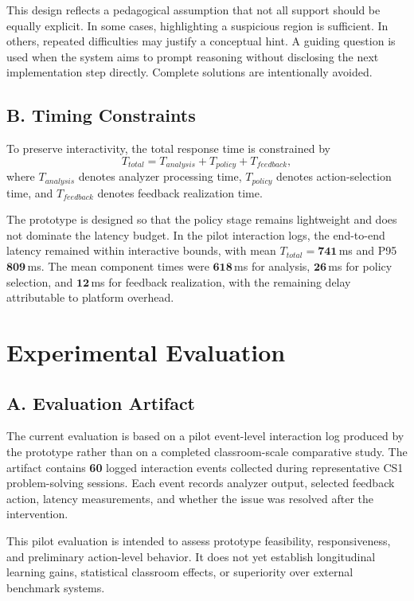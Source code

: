 \documentclass[conference]{IEEEtran}
\begin{document}
This design reflects a pedagogical assumption that not all support should be equally explicit. In some cases, highlighting a suspicious region is sufficient. In others, repeated difficulties may justify a conceptual hint. A guiding question is used when the system aims to prompt reasoning without disclosing the next implementation step directly. Complete solutions are intentionally avoided.

\subsection*{B. Timing Constraints}

To preserve interactivity, the total response time is constrained by
\[
T_{total} = T_{analysis} + T_{policy} + T_{feedback},
\]
where $T_{analysis}$ denotes analyzer processing time, $T_{policy}$ denotes action-selection time, and $T_{feedback}$ denotes feedback realization time.

The prototype is designed so that the policy stage remains lightweight and does not dominate the latency budget. In the pilot interaction logs, the end-to-end latency remained within interactive bounds, with mean $T_{total}=\textbf{741}$\,ms and P95 $\textbf{809}$\,ms. The mean component times were $\textbf{618}$\,ms for analysis, $\textbf{26}$\,ms for policy selection, and $\textbf{12}$\,ms for feedback realization, with the remaining delay attributable to platform overhead.

\section{Experimental Evaluation}\label{sec:evaluation}

\subsection*{A. Evaluation Artifact}

The current evaluation is based on a pilot event-level interaction log produced by the prototype rather than on a completed classroom-scale comparative study. The artifact contains \textbf{60} logged interaction events collected during representative CS1 problem-solving sessions. Each event records analyzer output, selected feedback action, latency measurements, and whether the issue was resolved after the intervention.

This pilot evaluation is intended to assess prototype feasibility, responsiveness, and preliminary action-level behavior. It does not yet establish longitudinal learning gains, statistical classroom effects, or superiority over external benchmark systems.
\end{document}
